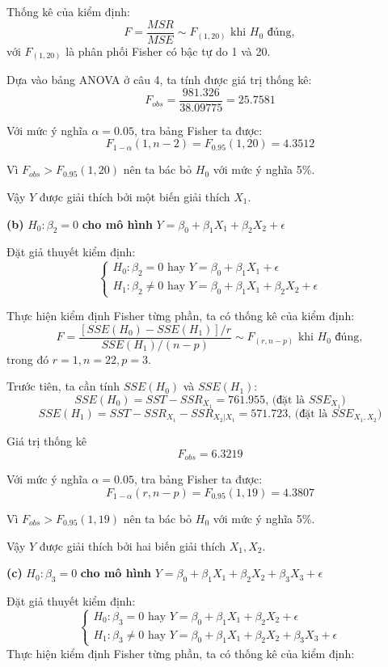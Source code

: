 \documentclass[a4paper]{article}
\theoremstyle{nonumberplain}
\begin{document}
Thống kê của kiểm định: 
$$F =  \displaystyle \frac{MSR}{MSE} \sim F_{(1,20)} \text{ khi } H_0 \text{ đúng},$$ 
với $F_{(1,20)}$ là phân phối Fisher có bậc tự do 1 và 20.

Dựa vào bảng ANOVA ở câu 4, ta tính được giá trị thống kê:
$$F_{obs} = \displaystyle \frac{981.326}{38.09775} = 25.7581$$

Với mức ý nghĩa $\alpha = 0.05$, tra bảng Fisher ta được:
$$F_{1-\alpha}(1,n-2) = F_{0.95}(1,20) = 4.3512$$

Vì $F_{obs}>F_{0.95}(1,20)$ nên ta bác bỏ $H_0$ với mức ý nghĩa 5\%.

Vậy $Y$ được giải thích bởi một biến giải thích $X_1$.

\textbf{(b)} $H_0 : \beta_2 = 0$ \textbf{cho mô hình } $Y = \beta_0 + \beta_1 X_1 + \beta_2 X_2 + \epsilon $

Đặt giả thuyết kiểm định:
\[\begin{cases}
	H_0 : \beta_2 = 0 \text{ hay } Y = \beta_0 + \beta_1 X_1 + \epsilon \\
	H_1 : \beta_2 \ne 0 \text{ hay } Y = \beta_0 + \beta_1 X_1 + \beta_2 X_2 + \epsilon
\end{cases}\]

Thực hiện kiểm định Fisher từng phần, ta có thống kê của kiểm định: 
$$F = \displaystyle \frac{\left [ SSE (H_0) - SSE(H_1) \right ] / r}{SSE(H_1)/(n-p)} \sim F_{(r,n-p)} \text{ khi } H_0 \text{ đúng},$$
trong đó $r = 1, n = 22, p = 3$.

Trước tiên, ta cần tính $SSE (H_0)$ và $SSE(H_1)$:
$$SSE(H_0) = SST - SSR_{X_1} = 761.955 \text{, (đặt là } SSE_{X_1})$$
$$SSE(H_1) = SST - SSR_{X_1} - SSR_{X_2|X_1} = 571.723 \text{, (đặt là }  SSE_{X_1,X_2})$$

Giá trị thống kê $$F_{obs} = 6.3219$$

Với mức ý nghĩa $\alpha = 0.05$, tra bảng Fisher ta được:
$$F_{1-\alpha}(r,n-p) = F_{0.95}(1,19) = 4.3807$$

Vì $F_{obs}>F_{0.95}(1,19)$ nên ta bác bỏ $H_0$ với mức ý nghĩa 5\%.

Vậy $Y$ được giải thích bởi hai biến giải thích $X_1, X_2$.

\textbf{(c)} $H_0 : \beta_3 = 0$ \textbf{cho mô hình } $Y = \beta_0 + \beta_1 X_1 + \beta_2 X_2 + \beta_3 X_3 + \epsilon $

Đặt giả thuyết kiểm định:
\[\begin{cases}
	H_0 : \beta_3 = 0 \text{ hay } Y = \beta_0 + \beta_1 X_1 + \beta_2 X_2 + \epsilon \\
	H_1 : \beta_3 \ne 0 \text{ hay } Y = \beta_0 + \beta_1 X_1 + \beta_2 X_2 + \beta_3 X_3 + \epsilon 
\end{cases}\]
Thực hiện kiểm định Fisher từng phần, ta có thống kê của kiểm định: 
\end{document}
